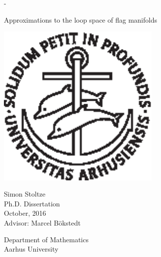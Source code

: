 \begin{titlingpage}
  \calccentering{\unitlength}
  \begin{adjustwidth*}{\unitlength}{-\unitlength}
    \begin{adjustwidth}{-1cm}{-1cm} 
      \vspace*{2cm}
      \centering
      \scshape
      
      {\Huge Approximations to the loop space of \newline\newline flag
        manifolds} \\
      
      \vspace*{3\onelineskip}
      
      \includegraphics[width=8cm]{billeder/segla1s.ps}    
      
      \vspace*{3\onelineskip}
      
      {\Large
        \linespread{1.4}\selectfont
        {\huge Simon Stoltze}\\
        Ph.D. Dissertation\\
        October, 2016 %
        \\ 
        \vspace{1em}
        Advisor: Marcel B\"okstedt}
      
      \strut\vfill
      Department of Mathematics\\
      Aarhus University
    \end{adjustwidth}
  \end{adjustwidth*}
  
\end{titlingpage}


